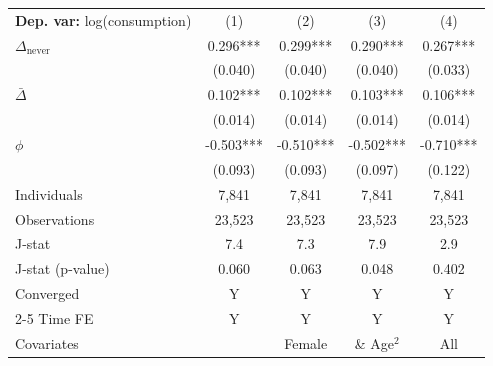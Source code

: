 \begin{tabular}{l cccc} \toprule  \textbf{Dep. var:}  log(consumption) 
                    &\multicolumn{1}{c}{(1)}   &\multicolumn{1}{c}{(2)}   &\multicolumn{1}{c}{(3)}   &\multicolumn{1}{c}{(4)}   \\

\addlinespace
$\Delta_{\text{never}}$&       0.296***&       0.299***&       0.290***&       0.267***\\
                    &     (0.040)   &     (0.040)   &     (0.040)   &     (0.033)   \\

\addlinespace
$\bar{\Delta}$      &       0.102***&       0.102***&       0.103***&       0.106***\\
                    &     (0.014)   &     (0.014)   &     (0.014)   &     (0.014)   \\

\addlinespace
$\phi$              &      -0.503***&      -0.510***&      -0.502***&      -0.710***\\
                    &     (0.093)   &     (0.093)   &     (0.097)   &     (0.122)   \\
\addlinespace
Individuals         &       7,841   &       7,841   &       7,841   &       7,841   \\
Observations        &      23,523   &      23,523   &      23,523   &      23,523   \\
J-stat              &         7.4   &         7.3   &         7.9   &         2.9   \\
J-stat (p-value)    &       0.060   &       0.063   &       0.048   &       0.402   \\
Converged           &           Y   &           Y   &           Y   &           Y   \\
\cmidrule{2-5} Time FE & Y & Y & Y & Y \\ Covariates & & Female & \& Age$^2$ & All \\ \bottomrule \end{tabular}
